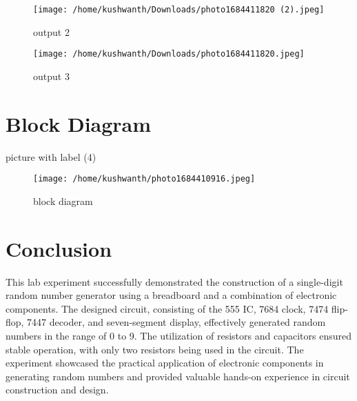 \documentclass[journal,12pt,onecolumn]{IEEEtran}
\theoremstyle{remark}
\begin{document}
 \begin{figure}[h]
 \centering
 \texttt{[image: /home/kushwanth/Downloads/photo1684411820 (2).jpeg]}
 \label{fig:tit}
 \caption{output 2}
 \end{figure}
 
 \begin{figure}[h]
 \centering
 \texttt{[image: /home/kushwanth/Downloads/photo1684411820.jpeg]}
 \label{fig:tot}
 \caption{output 3}
 \end{figure}
 
\section{Block Diagram}
picture with label (4)
\begin{figure}[h]
 \centering
 \texttt{[image: /home/kushwanth/photo1684410916.jpeg]}
 \label{fig:tpt}
 \caption{block diagram}
 \end{figure}
\section{Conclusion}
This lab experiment successfully demonstrated the construction of a single-digit random number generator using a breadboard and a combination of electronic components. The designed circuit, consisting of the 555 IC, 7684 clock, 7474 flip-flop, 7447 decoder, and seven-segment display, effectively generated random numbers in the range of 0 to 9. The utilization of resistors and capacitors ensured stable operation, with only two resistors being used in the circuit. The experiment showcased the practical application of electronic components in generating random numbers and provided valuable hands-on experience in circuit construction and design.
\end{document}
